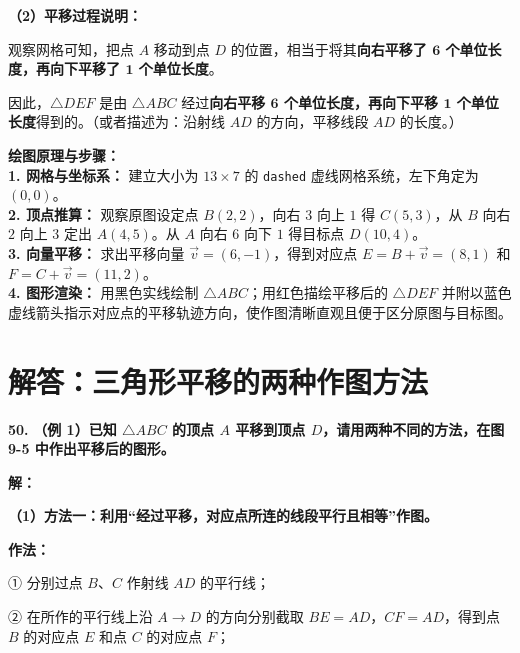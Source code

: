 \vspace{0.4cm}
\textbf{（2）平移过程说明：}

观察网格可知，把点 $A$ 移动到点 $D$ 的位置，相当于将其\textbf{向右平移了 $\mathbf{6}$ 个单位长度，再向下平移了 $\mathbf{1}$ 个单位长度}。

因此，$\triangle DEF$ 是由 $\triangle ABC$ 经过\textbf{向右平移 $\mathbf{6}$ 个单位长度，再向下平移 $\mathbf{1}$ 个单位长度}得到的。（或者描述为：沿射线 $AD$ 的方向，平移线段 $AD$ 的长度。）

\vspace{0.4cm}
{\small\color{blue!70!black}
\textbf{绘图原理与步骤：}\\
\textbf{1. 网格与坐标系：} 建立大小为 $13 \times 7$ 的 \texttt{dashed} 虚线网格系统，左下角定为 $(0,0)$。\\
\textbf{2. 顶点推算：} 观察原图设定点 $B(2,2)$，向右 $3$ 向上 $1$ 得 $C(5,3)$，从 $B$ 向右 $2$ 向上 $3$ 定出 $A(4,5)$。从 $A$ 向右 $6$ 向下 $1$ 得目标点 $D(10,4)$。\\
\textbf{3. 向量平移：} 求出平移向量 $\vec{v} = (6, -1)$，得到对应点 $E = B + \vec{v} = (8,1)$ 和 $F = C + \vec{v} = (11,2)$。\\
\textbf{4. 图形渲染：} 用黑色实线绘制 $\triangle ABC$；用红色描绘平移后的 $\triangle DEF$ 并附以蓝色虚线箭头指示对应点的平移轨迹方向，使作图清晰直观且便于区分原图与目标图。
}

\newpage



\section{解答：三角形平移的两种作图方法}

\vspace{0.6cm}

\textbf{\LARGE 50.} \textbf{（例 1）已知 $\triangle ABC$ 的顶点 $A$ 平移到顶点 $D$，请用两种不同的方法，在图 9-5 中作出平移后的图形。}

\vspace{0.4cm}
\textbf{解：}

\textbf{（1）方法一：利用“经过平移，对应点所连的线段平行且相等”作图。}

\textbf{作法：}

① 分别过点 $B$、$C$ 作射线 $AD$ 的平行线；

② 在所作的平行线上沿 $A \to D$ 的方向分别截取 $BE = AD$，$CF = AD$，得到点 $B$ 的对应点 $E$ 和点 $C$ 的对应点 $F$；

